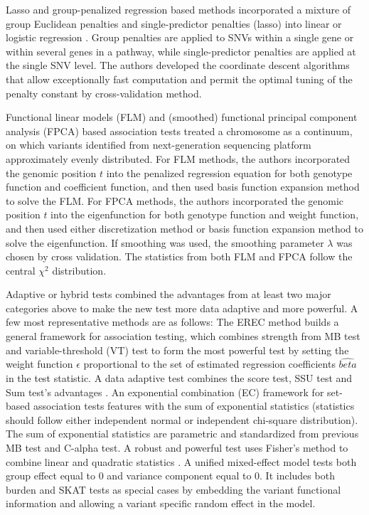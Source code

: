 \documentclass[12pt]{article}
\begin{document}
Lasso and group-penalized regression based methods incorporated a mixture of group Euclidean penalties and single-predictor penalties (lasso) into linear or logistic regression \cite{Zhou2010,Kim2014}. Group penalties are applied to SNVs within a single gene or within several genes in a pathway, while single-predictor penalties are applied at the single SNV level. The authors developed the coordinate descent algorithms that allow exceptionally fast computation and
permit the optimal tuning of the penalty constant by cross-validation method.

Functional linear models (FLM) and (smoothed) functional principal component analysis (FPCA) based association tests \cite{Luo2011,Luo2012, Luo2012a,Fan2013} treated a chromosome as a continuum, on which variants identified from next-generation sequencing platform approximately evenly distributed. For FLM methods, the authors incorporated the genomic position $t$ into the penalized regression equation for both genotype function and coefficient function, and then used basis function expansion method to solve the FLM. For FPCA methods, the authors incorporated the genomic position $t$ into the eigenfunction for both genotype function and weight function, and then used either discretization method or basis function expansion method to solve the eigenfunction. If smoothing was used, the smoothing parameter $\lambda$ was chosen by cross validation. The statistics from both FLM and FPCA follow the central $\chi^2$ distribution.

Adaptive or hybrid tests combined the advantages from at least two major categories above to make the new test more data adaptive and more powerful. A few most representative methods are as follows: The EREC method \cite{Lin2011} builds a general framework for association testing, which combines strength from MB test and variable-threshold (VT) test \cite{Price2010} to form the most powerful test by setting the weight function $\epsilon$ proportional to the set of estimated regression coefficients $\hat{beta}$ in the test statistic. A data adaptive test combines the score test, SSU test and Sum test's advantages \cite{Pan2011}. An exponential combination (EC) framework for set-based association tests \cite{Chen2012} features with the sum of exponential statistics (statistics should follow either independent normal or independent chi-square distribution). The sum of exponential statistics are parametric and standardized from previous MB test and C-alpha test. A robust and powerful test uses Fisher's method to combine linear and quadratic statistics \cite{Derkach2013}. A unified mixed-effect model \cite{Sun2013} tests both group effect equal to 0 and variance component equal to 0. It includes both burden and SKAT tests as special cases by embedding the variant functional information and allowing a variant specific random effect in the model.
\end{document}
